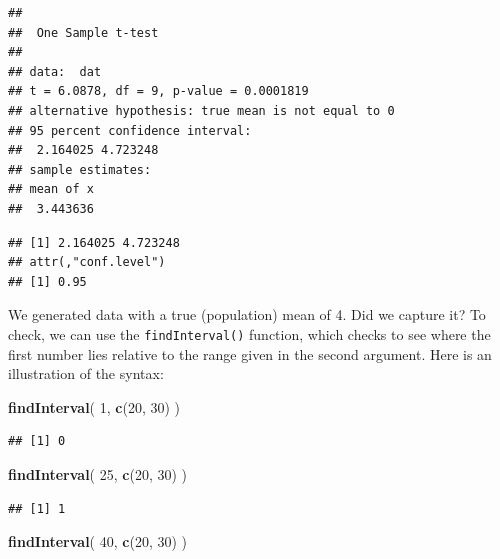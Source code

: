 \documentclass[
]{book}
\newenvironment{Shaded}{\begin{snugshade}}{\end{snugshade}}
\newcommand{\CommentTok}[1]{\textcolor[rgb]{0.56,0.35,0.01}{\textit{#1}}}
\newcommand{\DecValTok}[1]{\textcolor[rgb]{0.00,0.00,0.81}{#1}}
\newcommand{\FunctionTok}[1]{\textcolor[rgb]{0.13,0.29,0.53}{\textbf{#1}}}
\newcommand{\NormalTok}[1]{#1}
\newcommand{\SpecialCharTok}[1]{\textcolor[rgb]{0.81,0.36,0.00}{\textbf{#1}}}
\begin{document}
\begin{verbatim}
## 
##  One Sample t-test
## 
## data:  dat
## t = 6.0878, df = 9, p-value = 0.0001819
## alternative hypothesis: true mean is not equal to 0
## 95 percent confidence interval:
##  2.164025 4.723248
## sample estimates:
## mean of x 
##  3.443636
\end{verbatim}

\begin{Shaded}
\end{Shaded}

\begin{verbatim}
## [1] 2.164025 4.723248
## attr(,"conf.level")
## [1] 0.95
\end{verbatim}

We generated data with a true (population) mean of 4. Did we capture it? To check, we can use the \texttt{findInterval()} function, which checks to see where the first number lies relative to the range given in the second argument.
Here is an illustration of the syntax:

\begin{Shaded}
\begin{Highlighting}[]
\FunctionTok{findInterval}\NormalTok{( }\DecValTok{1}\NormalTok{, }\FunctionTok{c}\NormalTok{(}\DecValTok{20}\NormalTok{, }\DecValTok{30}\NormalTok{) )}
\end{Highlighting}
\end{Shaded}

\begin{verbatim}
## [1] 0
\end{verbatim}

\begin{Shaded}
\begin{Highlighting}[]
\FunctionTok{findInterval}\NormalTok{( }\DecValTok{25}\NormalTok{, }\FunctionTok{c}\NormalTok{(}\DecValTok{20}\NormalTok{, }\DecValTok{30}\NormalTok{) )}
\end{Highlighting}
\end{Shaded}

\begin{verbatim}
## [1] 1
\end{verbatim}

\begin{Shaded}
\begin{Highlighting}[]
\FunctionTok{findInterval}\NormalTok{( }\DecValTok{40}\NormalTok{, }\FunctionTok{c}\NormalTok{(}\DecValTok{20}\NormalTok{, }\DecValTok{30}\NormalTok{) )}
\end{Highlighting}
\end{Shaded}
\end{document}
